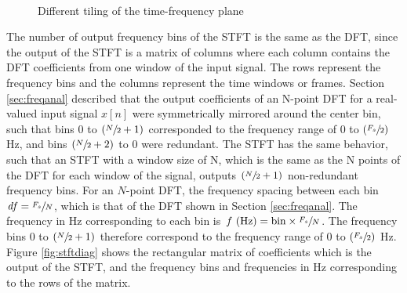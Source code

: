 \documentclass[report.tex]{subfiles}
\begin{document}
\begin{figure}[ht]
	\centering
	\\
	\caption{Different tiling of the time-frequency plane \parencite[326, 327]{gabordiagrams}}
	\label{fig:gabortf}
\end{figure}

The number of output frequency bins of the STFT is the same as the DFT, since the output of the STFT is a matrix of columns where each column contains the DFT coefficients from one window of the input signal. The rows represent the frequency bins and the columns represent the time windows or frames. Section \ref{sec:freqanal} described that the output coefficients of an N-point DFT for a real-valued input signal $x[n]$ were symmetrically mirrored around the center bin, such that bins 0 to $(\sfrac{N}{2}+1)$ corresponded to the frequency range of 0 to $(\sfrac{F_{s}}{2})$ Hz, and bins $(\sfrac{N}{2}+2)$ to 0 were redundant. The STFT has the same behavior, such that an STFT with a window size of N, which is the same as the N points of the DFT for each window of the signal, outputs $(\sfrac{N}{2}+1)$ non-redundant frequency bins. For an $N$-point DFT, the frequency spacing between each bin $\mathit{df} = \sfrac{F_{s}}{N}$, which is that of the DFT shown in Section \ref{sec:freqanal}. The frequency in Hz corresponding to each bin is $f \text{ (Hz)} = \text{bin}\times\sfrac{F_{s}}{N}$. The frequency bins 0 to $(\sfrac{N}{2}+1)$ therefore correspond to the frequency range of 0 to $(\sfrac{F_{s}}{2})$ Hz. Figure \ref{fig:stftdiag} shows the rectangular matrix of coefficients which is the output of the STFT, and the frequency bins and frequencies in Hz corresponding to the rows of the matrix.
\end{document}

